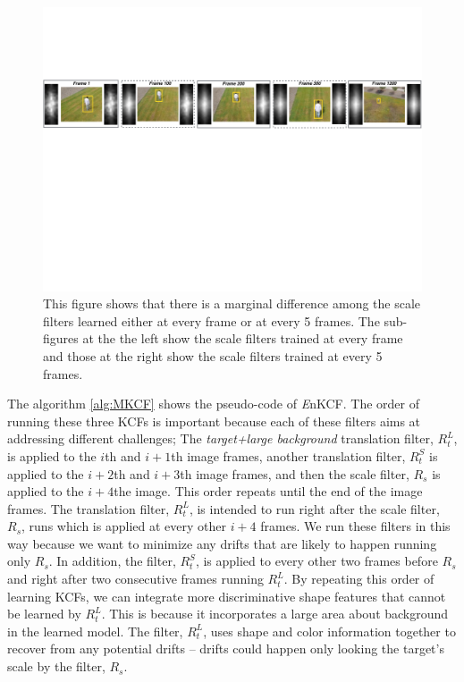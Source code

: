 \documentclass{bmvc2k}
\begin{document}
\begin{figure}[!h]
\centering
\includegraphics[width=1\textwidth]{figures/LearnedFiltersComparison2.pdf}
\caption{This figure shows that there is a marginal difference among
  the scale filters learned either at every frame or at every 5
  frames. The sub-figures at the the left show the scale filters
  trained at every frame and those at the right show the scale filters
  trained at every 5 frames.}
\label{fig:Filters_Comparison}
\end{figure}

The algorithm \ref{alg:MKCF} shows the pseudo-code of {\it E}nKCF.
The order of running these three KCFs is important because each of
these filters aims at addressing different challenges; The
\textit{target+large background} translation filter, $R_{t}^{L}$, is
applied to the $i$th and $i+1$th image frames, another translation
filter, $R_{t}^{S}$ is applied to the $i+2$th and $i+3$th image
frames, and then the scale filter, $R_{s}$ is applied to the $i+4$the
image. This order repeats until the end of the image frames. The
translation filter, $R_{t}^{L}$, is intended to run right after the
scale filter, $R_s$, runs which is applied at every other $i+4$
frames. We run these filters in this way because we want to minimize
any drifts that are likely to happen running only $R_{s}$. In
addition, the filter, $R_{t}^{S}$, is applied to every other two
frames before $R_{s}$ and right after two consecutive frames running
$R_{t}^{L}$. By repeating this order of learning KCFs, we can
integrate more discriminative shape features that cannot be learned by
$R_{t}^{L}$. This is because it incorporates a large area about
background in the learned model. The filter, $R_{t}^{L}$, uses shape
and color information together to recover from any potential drifts --
drifts could happen only looking the target's scale by the filter,
$R_{s}$.
\end{document}
